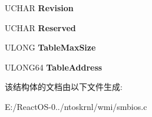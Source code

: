 \begin{DoxyCompactItemize}
U\+C\+H\+AR {\bfseries Revision}
\item 
\mbox{\label{struct___s_m_b_i_o_s30___e_n_t_r_y___p_o_i_n_t_a54917ddcc0425579d5122be95f7efe69}} 
U\+C\+H\+AR {\bfseries Reserved}
\item 
\mbox{\label{struct___s_m_b_i_o_s30___e_n_t_r_y___p_o_i_n_t_a5fb05caa3be0b60f2b031e70161222c8}} 
U\+L\+O\+NG {\bfseries Table\+Max\+Size}
\item 
\mbox{\label{struct___s_m_b_i_o_s30___e_n_t_r_y___p_o_i_n_t_abc1c766411765080107183cc50210fe8}} 
U\+L\+O\+N\+G64 {\bfseries Table\+Address}
\end{DoxyCompactItemize}


该结构体的文档由以下文件生成\+:\begin{DoxyCompactItemize}
\item 
E\+:/\+React\+O\+S-\/0../ntoskrnl/wmi/smbios.\+c\end{DoxyCompactItemize}
